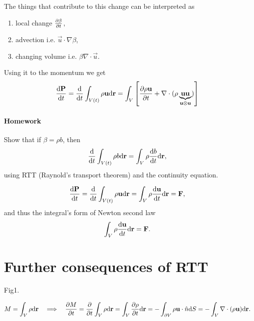 \documentclass[11pt,oneside]{book}
\theoremstyle{definition} %
\theoremstyle{plain} %
\theoremstyle{remark} %
\theoremstyle{underline}
\begin{document}
  The things that contribute to this change can be interpreted as
  \begin{enumerate}
    \item local change $\frac{\partial \beta}{\partial t}$,
    \item advection i.e. $\vec u \cdot \nabla \beta$,
    \item changing volume i.e. $\beta \nabla\cdot \vec u$.
  \end{enumerate}

  Using it to the momentum we get
  \begin{displaymath}
    \frac{\mathrm{d} \mathbf{P} }{\mathrm{d} t} = \frac{\mathrm{d} }{\mathrm{d} t} \int_{V(t)} \rho \mathbf{u} \mathrm{d} \mathbf{r} 
    = \int_V \left[ \frac{\partial \rho\mathbf{u} }{\partial t} + \nabla \cdot (\rho \underbrace{\mathbf{u} \mathbf{u}}_{\mathbf{u} \otimes \mathbf{u}}) \right]
  \end{displaymath}
  
  \paragraph{Homework} Show that if $\beta = \rho b$, then 
  \begin{displaymath}
    \frac{\mathrm{d} }{\mathrm{d} t} \int_{V(t)} \rho b \mathrm{d} \mathbf{r} = \int_{V} \rho \frac{\mathrm{d} b}{\mathrm{d} t} \mathrm{d} \mathbf{r},
  \end{displaymath}
  using RTT (Raynold's transport theorem) and the continuity equation.
  
  \begin{displaymath}
    \frac{\mathrm{d} \mathbf{P}}{\mathrm{d} t} = \frac{\mathrm{d} }{\mathrm{d} t} \int_{V(t)} \rho \mathbf{u} \mathrm{d} \mathbf{r} 
    = \int_V \rho \frac{\mathrm{d} \mathbf{u}}{\mathrm{d} t} \mathrm{d} \mathbf{r} 
    = \mathbf{F},
  \end{displaymath}
  and thus the integral's form of Newton second law
  \begin{displaymath}
    \int_V \rho \frac{\mathrm{d} \mathbf{u}}{\mathrm{d} t} \mathrm{d} \mathbf{r} = \mathbf{F}.
  \end{displaymath}
  
  \section{Further consequences of RTT}
  \todo Fig1.
  
  \begin{displaymath}
    M = \int_V \rho \mathrm{d} \mathbf{r} \quad \Longrightarrow \quad \frac{\partial M}{\partial t} 
    = \frac{\partial }{\partial t} \int_V \rho \mathrm{d} \mathbf{r} 
    = \int_V \frac{\partial \rho}{\partial t} \mathrm{d} \mathbf{r} 
    = - \int_{\partial V} \rho \mathbf{u} \cdot \hat n \mathrm{d} S 
    = - \int_V \nabla \cdot (\rho \mathbf{u}) \mathrm{d} \mathbf{r}.
  \end{displaymath}
\end{document}

